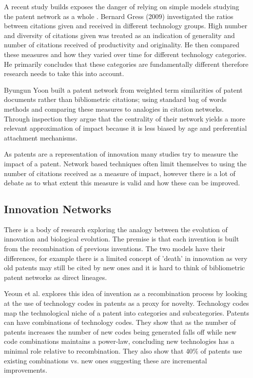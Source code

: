 A recent study builds exposes the danger of relying on simple models studying the patent network as a whole \cite{gress2010properties}. Bernard Gress (2009) investigated the ratios between citations given and received in different technology groups. High number and diversity of citations given was treated as an indication of generality and number of citations received of productivity and originality. He then compared these measures and how they varied over time for different technology categories. He primarily concludes that these categories are fundamentally different therefore research needs to take this into account. 

Byungun Yoon \cite{yoon2004text} built a patent network from weighted term similarities of patent documents rather than bibliometric citations; using standard bag of words methods and comparing these measures to analogies in citation networks. Through inspection they argue that the centrality of their network yields a more relevant approximation of impact because it is less biased by age and preferential attachment mechanisms. 

As patents are a representation of innovation many studies try to measure the impact of a patent. Network based techniques often limit themselves to using the number of citations received as a measure of impact, however there is a lot of debate as to what extent this measure is valid and how these can be improved. 

\subsection{Innovation Networks}

There is a body of research exploring the analogy between the evolution of innovation and biological evolution. The premise is that each invention is built from the recombination of previous inventions. The two models have their differences, for example there is a limited concept of 'death' in innovation as very old patents may still be cited by new ones and it is hard to think of bibliometric patent networks as direct lineages. 

Yeoun et al. \cite{youn2015invention} explores this idea of invention as a recombination process by looking at the use of technology codes in patents as a proxy for novelty. Technology codes map the technological niche of a patent into categories and subcategories. Patents can have combinations of technology codes. They show that as the number of patents increases the number of new codes being generated falls off while new code combinations maintains a power-law, concluding new technologies has a minimal role relative to recombination. They also show that 40\% of patents use existing combinations vs. new ones suggesting these are incremental improvements. 

